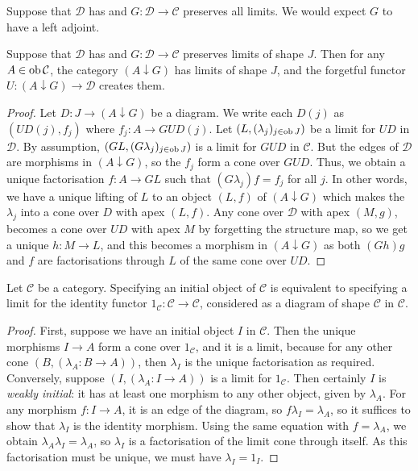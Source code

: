 Suppose that \( \mathcal D \) has and \( G : \mathcal D \to \mathcal C \) preserves all limits.
We would expect \( G \) to have a left adjoint.
\begin{lemma}
    Suppose that \( \mathcal D \) has and \( G : \mathcal D \to \mathcal C \) preserves limits of shape \( J \).
    Then for any \( A \in \operatorname{ob} \mathcal C \), the category \( (A \downarrow G) \) has limits of shape \( J \), and the forgetful functor \( U : (A \downarrow G) \to \mathcal D \) creates them.
\end{lemma}
\begin{proof}
    Let \( D : J \to (A \downarrow G) \) be a diagram.
    We write each \( D(j) \) as \( (UD(j), f_j) \) where \( f_j : A \to GUD(j) \).
    Let \( (L, (\lambda_j)_{j \in \operatorname{ob} J}) \) be a limit for \( UD \) in \( \mathcal D \).
    By assumption, \( (GL, (G\lambda_j)_{j \in \operatorname{ob} J}) \) is a limit for \( GUD \) in \( \mathcal C \).
    But the edges of \( \mathcal D \) are morphisms in \( (A \downarrow G) \), so the \( f_j \) form a cone over \( GUD \).
    Thus, we obtain a unique factorisation \( f : A \to GL \) such that \( (G\lambda_j) f = f_j \) for all \( j \).
    In other words, we have a unique lifting of \( L \) to an object \( (L, f) \) of \( (A \downarrow G) \) which makes the \( \lambda_j \) into a cone over \( D \) with apex \( (L, f) \).
    Any cone over \( \mathcal D \) with apex \( (M, g) \), becomes a cone over \( UD \) with apex \( M \) by forgetting the structure map, so we get a unique \( h : M \to L \), and this becomes a morphism in \( (A \downarrow G) \) as both \( (Gh)g \) and \( f \) are factorisations through \( L \) of the same cone over \( UD \). 
\end{proof}
\begin{lemma}
    Let \( \mathcal C \) be a category.
    Specifying an initial object of \( \mathcal C \) is equivalent to specifying a limit for the identity functor \( 1_{\mathcal C} : \mathcal C \to \mathcal C \), considered as a diagram of shape \( \mathcal C \) in \( \mathcal C \).
\end{lemma}
\begin{proof}
    First, suppose we have an initial object \( I \) in \( \mathcal C \).
    Then the unique morphisms \( I \to A \) form a cone over \( 1_{\mathcal C} \), and it is a limit, because for any other cone \( (B, (\lambda_A : B \to A)) \), then \( \lambda_I \) is the unique factorisation as required.
    Conversely, suppose \( (I, (\lambda_A : I \to A)) \) is a limit for \( 1_{\mathcal C} \).
    Then certainly \( I \) is \emph{weakly initial}: it has at least one morphism to any other object, given by \( \lambda_A \).
    For any morphism \( f : I \to A \), it is an edge of the diagram, so \( f \lambda_I = \lambda_A \), so it suffices to show that \( \lambda_I \) is the identity morphism.
    Using the same equation with \( f = \lambda_A \), we obtain \( \lambda_A \lambda_I = \lambda_A \), so \( \lambda_I \) is a factorisation of the limit cone through itself.
    As this factorisation must be unique, we must have \( \lambda_I = 1_I \).
\end{proof}
